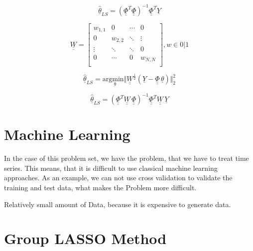  \begin{equation}
			\hat{\underline{\theta}}_{LS} = (\underline{\underline{\Phi}}^T\underline{\underline{\Phi}})^{-1}\underline{\underline{\Phi}}^T\underline{Y}	
	\label{eq:LS_intro_solved}
\end{equation}


 \begin{equation}
			\underline{\underline{W}}  =  \begin{bmatrix}
		w_{1,1} & 0 & \cdots & 0 \\
		0 & w_{2,2} & \ddots & \vdots \\
		\vdots & \ddots & \ddots & 0 \\
		0 & \cdots & 0 & w_{N,N} \\
				\end{bmatrix},
				w \in {0|1}
	\label{eq:weightmatrix}
\end{equation}



 \begin{equation}
			\hat{\underline{\theta}}_{LS} = \mathrm{arg \underset{\theta} min} \Vert \underline{\underline{W}}^{\frac{1}{2}}(\underline{Y}-\underline{\underline{\Phi}} \, \underline{\theta}) \Vert^2_2 	
	\label{eq:w_LS_intro}
\end{equation}

 \begin{equation}
	\hat{\underline{\theta}}_{LS} = (\underline{\underline{\Phi}}^T\underline{\underline{W}} \, \underline{\underline{\Phi}})^{-1}\underline{\underline{\Phi}}^T \underline{\underline{W}} \, \underline{Y}
	\label{eq:solution_w_LS}
\end{equation}

\section{Machine Learning}
\label{sec:machine_learning}

In the case of this problem set, we have the problem, that we have to treat time series. This means, that it is difficult to use classical machine learning approaches. As an example, we can not use cross validation to validate the training and test data, what makes the Problem more difficult.

Relatively small amount of Data, because it is expensive to generate data.

\section{Group LASSO Method}
\label{sec:Group_LASSO}



